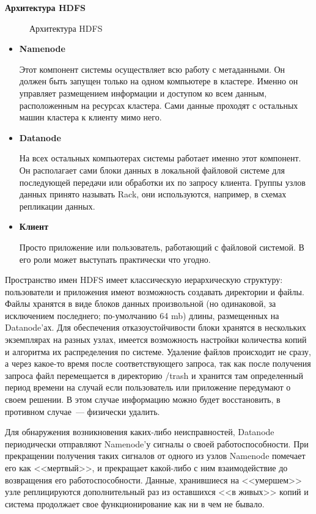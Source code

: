 \textbf{Архитектура HDFS}

\begin{figure}[ht!]
\caption{Архитектура HDFS}
\label{ris:hdfsarchitecture}
\end{figure}

\begin{itemize}
\item \textbf{Namenode}

Этот компонент системы осуществляет всю работу с метаданными. Он должен быть запущен только на одном компьютере 
в кластере. Именно он управляет размещением информации и доступом ко всем данным, расположенным на ресурсах кластера. 
Сами данные проходят с остальных машин кластера к клиенту мимо него.

\item \textbf{Datanode}

На всех остальных компьютерах системы работает именно этот компонент. Он располагает сами блоки данных в локальной 
файловой системе для последующей передачи или обработки их по запросу клиента. Группы узлов данных принято называть 
Rack, они используются, например, в схемах репликации данных.

\item \textbf{Клиент}

Просто приложение или пользователь, работающий с файловой системой. В его роли может выступать практически что угодно.
\end{itemize}

Пространство имен HDFS имеет классическую иерархическую структуру: пользователи и приложения имеют возможность 
создавать директории и файлы. Файлы хранятся в виде блоков данных произвольной (но одинаковой, за исключением последнего; 
по-умолчанию 64 mb) длины, размещенных на Datanode'ах. Для обеспечения отказоустойчивости блоки хранятся в нескольких 
экземплярах на разных узлах, имеется возможность настройки количества копий и алгоритма их распределения по системе. 
Удаление файлов происходит не сразу, а через какое-то время после соответствующего запроса, так как после получения 
запроса файл перемещается в директорию /trash и хранится там определенный период времени на случай если пользователь 
или приложение передумают о своем решении. В этом случае информацию можно будет восстановить, в противном случае~--- физически удалить.

Для обнаружения возникновения каких-либо неисправностей, Datanode периодически отправляют Namenode'у сигналы о 
своей работоспособности. При прекращении получения таких сигналов от одного из узлов Namenode помечает его как <<мертвый>>, 
и прекращает какой-либо с ним взаимодействие до возвращения его работоспособности. Данные, хранившиеся на <<умершем>> узле 
реплицируются дополнительный раз из оставшихся <<в живых>> копий и система продолжает свое функционирование как ни в чем не бывало.


